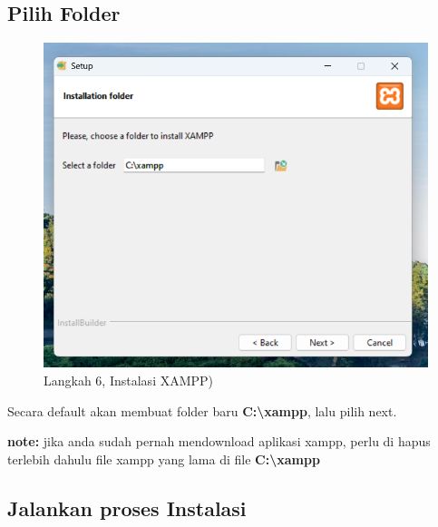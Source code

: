 \documentclass[
]{book}
\begin{document}
\hypertarget{pilih-folder}{%
\subsection{Pilih Folder}\label{pilih-folder}}

\begin{figure}

{\centering \includegraphics[width=1\linewidth]{./images/Bab1/xampp5} 

}

\caption{Langkah 6, Instalasi XAMPP)}\label{fig:install-xammp5}
\end{figure}

Secara default akan membuat folder baru \textbf{C:\textbackslash xampp}, lalu pilih next.

\textbf{note:} jika anda sudah pernah mendownload aplikasi xampp, perlu di hapus terlebih dahulu file xampp yang lama di file \textbf{C:\textbackslash xampp}

\hypertarget{jalankan-proses-instalasi}{%
\subsection{Jalankan proses Instalasi}\label{jalankan-proses-instalasi}}
\end{document}

